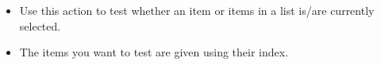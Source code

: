 \begin{itemize}
\item Use this action to test whether an item or items in a list is/are currently selected. 
\item The items you want to test are given using their index. 
\end{itemize}
